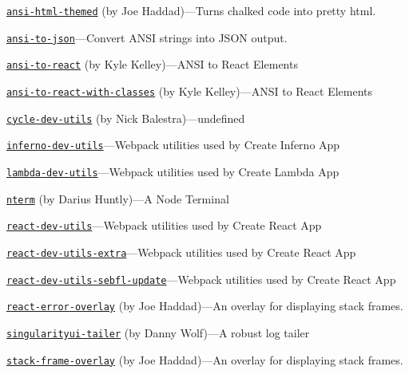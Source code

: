 \begin{DoxyItemize}
\item \href{https://npmjs.com/package/ansi-html-themed}{\tt {\ttfamily ansi-\/html-\/themed}} (by Joe Haddad)—\+Turns chalked code into pretty html.
\item \href{https://github.com/IonicaBizau/ansi-to-json#readme}{\tt {\ttfamily ansi-\/to-\/json}}—\+Convert A\+N\+SI strings into J\+S\+ON output.
\item \href{https://github.com/nteract/ansi-to-react#readme}{\tt {\ttfamily ansi-\/to-\/react}} (by Kyle Kelley)—\+A\+N\+SI to React Elements
\item \href{https://npmjs.com/package/ansi-to-react-with-classes}{\tt {\ttfamily ansi-\/to-\/react-\/with-\/classes}} (by Kyle Kelley)—\+A\+N\+SI to React Elements
\item \href{https://github.com/cyclejs-community/create-cycle-app#readme}{\tt {\ttfamily cycle-\/dev-\/utils}} (by Nick Balestra)—undefined
\item \href{https://github.com/infernojs/create-inferno-app#readme}{\tt {\ttfamily inferno-\/dev-\/utils}}—\+Webpack utilities used by Create Inferno App
\item \href{https://github.com/channl/create-lambda-app#readme}{\tt {\ttfamily lambda-\/dev-\/utils}}—\+Webpack utilities used by Create Lambda App
\item \href{https://github.com/dariushuntly/nterm/issues}{\tt {\ttfamily nterm}} (by Darius Huntly)—A Node Terminal
\item \href{https://github.com/facebookincubator/create-react-app#readme}{\tt {\ttfamily react-\/dev-\/utils}}—\+Webpack utilities used by Create React App
\item \href{https://github.com/facebookincubator/create-react-app-extra#readme}{\tt {\ttfamily react-\/dev-\/utils-\/extra}}—\+Webpack utilities used by Create React App
\item \href{https://github.com/facebookincubator/create-react-app#readme}{\tt {\ttfamily react-\/dev-\/utils-\/sebfl-\/update}}—\+Webpack utilities used by Create React App
\item \href{https://github.com/facebookincubator/create-react-app#readme}{\tt {\ttfamily react-\/error-\/overlay}} (by Joe Haddad)—\+An overlay for displaying stack frames.
\item \href{https://github.com/HubSpot/Singularity#readme}{\tt {\ttfamily singularityui-\/tailer}} (by Danny Wolf)—A robust log tailer
\item \href{https://npmjs.com/package/stack-frame-overlay}{\tt {\ttfamily stack-\/frame-\/overlay}} (by Joe Haddad)—\+An overlay for displaying stack frames.

\end{DoxyItemize}

